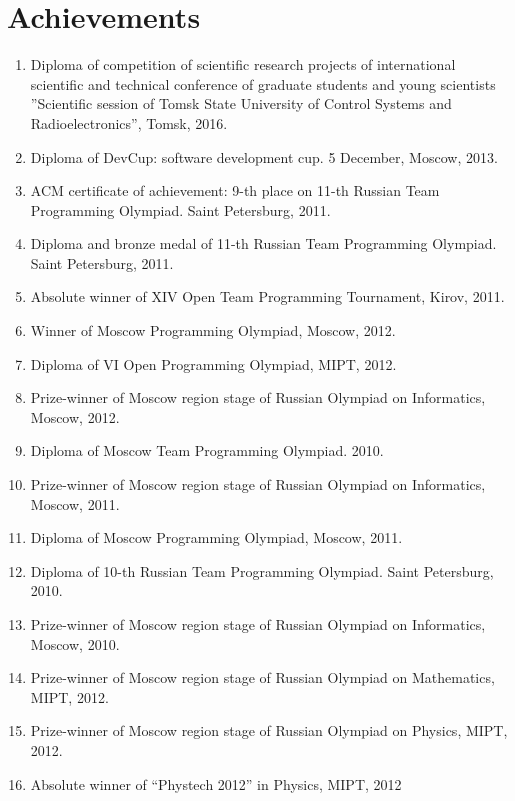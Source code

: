 \documentclass[a4paper,10pt]{article}
\begin{document}
\section{Achievements}
\begin{enumerate}
\item Diploma of competition of scientific research projects of international scientific and
technical conference of graduate students and young scientists ”Scientific session of Tomsk
State University of Control Systems and Radioelectronics”, Tomsk, 2016.
\item Diploma of DevCup: software development cup. 5 December, Moscow, 2013.
\item ACM certificate of achievement: 9-th place on 11-th Russian Team Programming Olympiad. Saint Petersburg, 2011.
\item Diploma and bronze medal of 11-th Russian Team Programming Olympiad. Saint Petersburg, 2011.
\item Absolute winner of XIV Open Team Programming Tournament, Kirov, 2011.
\item Winner of Moscow Programming Olympiad, Moscow, 2012.
\item Diploma of VI Open Programming Olympiad, MIPT, 2012.
\item Prize-winner of Moscow region stage of Russian Olympiad on Informatics, Moscow, 2012.
\item Diploma of Moscow Team Programming Olympiad. 2010.
\item Prize-winner of Moscow region stage of Russian Olympiad on Informatics, Moscow, 2011.
\item Diploma of Moscow Programming Olympiad, Moscow, 2011.
\item Diploma of 10-th Russian Team Programming Olympiad. Saint Petersburg, 2010.
\item Prize-winner of Moscow region stage of Russian Olympiad on Informatics, Moscow, 2010.
\item Prize-winner of Moscow region stage of Russian Olympiad on Mathematics, MIPT, 2012.
\item Prize-winner of Moscow region stage of Russian Olympiad on Physics, MIPT, 2012.
\item Absolute winner of “Phystech 2012” in Physics, MIPT, 2012
\end{enumerate}
\end{document}
